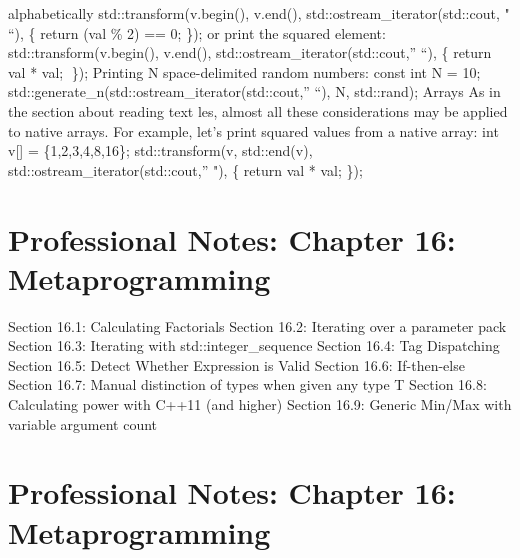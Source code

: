 alphabetically std::transform(v.begin(), v.end(),
std::ostream\_iterator(std::cout, " ``), \href{int\%20val}{} \{ return
(val \% 2) == 0; \}); or print the squared element:
std::transform(v.begin(), v.end(), std::ostream\_iterator(std::cout,''
``), \href{int\%20val}{} \{ return val * val; \}); Printing N
space-delimited random numbers: const int N = 10;
std::generate\_n(std::ostream\_iterator(std::cout,'' ``), N, std::rand);
Arrays As in the section about reading text les, almost all these
considerations may be applied to native arrays. For example, let's print
squared values from a native array: int v{[}{]} = \{1,2,3,4,8,16\};
std::transform(v, std::end(v), std::ostream\_iterator(std::cout,'' "),
\href{int\%20val}{} \{ return val * val; \});

\hypertarget{professional-notes-chapter-16-metaprogramming}{%
\section{Professional Notes: Chapter 16:
Metaprogramming}\label{professional-notes-chapter-16-metaprogramming}}

Section 16.1: Calculating Factorials Section 16.2: Iterating over a
parameter pack Section 16.3: Iterating with std::integer\_sequence
Section 16.4: Tag Dispatching Section 16.5: Detect Whether Expression is
Valid Section 16.6: If-then-else Section 16.7: Manual distinction of
types when given any type T Section 16.8: Calculating power with C++11
(and higher) Section 16.9: Generic Min/Max with variable argument count

\hypertarget{professional-notes-chapter-16-metaprogramming-1}{%
\section{Professional Notes: Chapter 16:
Metaprogramming}\label{professional-notes-chapter-16-metaprogramming-1}}

